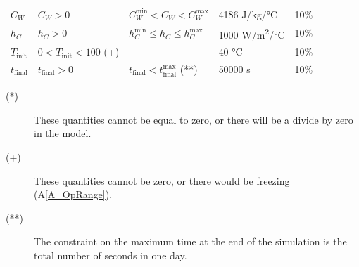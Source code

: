 \documentclass[12pt]{article}
\newcommand{\aref}[1]{A\ref{#1}}
\begin{document}
\begin{table}[!h]
\begin{longtable*}{l l l l c}
  \\
  $C_W$ & $C_W > 0$ & $C_W^{\text{min}} < C_W < C_W^{\text{max}}$ & 4186 
	\si[per-mode=symbol] {\joule\per\kilo\gram\per\celsius} & 10\%
  \\
  $h_C$ & $h_C > 0$ & $h_C^{\text{min}} \leq h_C \leq h_C^{\text{max}}$ 
	& 1000 \si[per-mode=symbol] {\watt\per\square\metre\per\celsius} & 10\%
  \\
  $T_\text{init}$ & $0 < T_\text{init} < 100 $ (+) & & 40 \si[per-mode=symbol] {\celsius} & 10\%
  \\
  $t_\text{final}$ & $t_\text{final} > 0$ & $t_\text{final} < t_{\text{final}}^{\text{max}}$ (**) 
		& 50000 \si[per-mode=symbol] {\second} & 10\%
  \\
  \bottomrule
\end{longtable*}
\end{table}

\noindent 
\begin{description}
\item[(*)] These quantities cannot be equal to zero, or there will be a divide
  by zero in the model.
\item[(+)] These quantities cannot be zero, or there would be freezing
  (\aref{A_OpRange}).
\item[(**)] The constraint on the maximum time at the end of the simulation is 
	the total number of seconds in one day.

\end{description}
\end{document}
